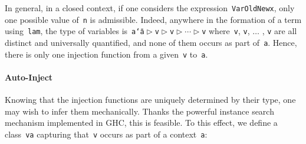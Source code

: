 \documentclass[9pt,authoryear]{sigplanconf}
\begin{document}
%
In general, in a closed context, if one considers the
    expression{~}\texttt{Var}\texttt{\mbox{\hspace{0.50em}}}\texttt{\makebox[1.22ex][l]{$ {(} $}}\texttt{\makebox[1.22ex][l]{$ {(} $}}\texttt{Old}\texttt{\makebox[1.22ex][r]{$ {)} $}}\texttt{}\texttt{\mbox{\hspace{0.50em}}}\texttt{\makebox[1.22ex][l]{$ {(} $}}\texttt{New}\texttt{\mbox{\hspace{0.50em}}}\texttt{x}\texttt{\makebox[1.22ex][r]{$ {)} $}}\texttt{\makebox[1.22ex][r]{$ {)} $}}, only one possible value
    of{~}\texttt{n} is admissible. Indeed, anywhere in the formation of a term
    using{~}\texttt{lam}, the type of variables is{~}\texttt{a}\texttt{\mbox{\hspace{0.50em}}}\texttt{{\char `\=}}\texttt{\mbox{\hspace{0.50em}}}\texttt{a}\texttt{\mbox{\hspace{0.50em}}}\texttt{$ \vartriangleright $}\texttt{\mbox{\hspace{0.50em}}}\texttt{v}\texttt{\mbox{\hspace{0.50em}}}\texttt{$ \vartriangleright $}\texttt{\mbox{\hspace{0.50em}}}\texttt{v}\texttt{\mbox{\hspace{0.50em}}}\texttt{$ \vartriangleright $}\texttt{\mbox{\hspace{0.50em}}}\texttt{$ \cdots $}\texttt{\mbox{\hspace{0.50em}}}\texttt{$ \vartriangleright $}\texttt{\mbox{\hspace{0.50em}}}\texttt{v}    where{~}\texttt{v}, \texttt{v}, $ \ldots $ , \texttt{v} are all distinct and universally
    quantified, and none of them occurs as part of{~}\texttt{a}. Hence, there
    is only one injection function from a given{~}\texttt{v} to{~}\texttt{a}.%


\paragraph*{Auto-Inject}

%
Knowing that the injection functions are uniquely determined by
    their type, one may wish to infer them mechanically. Thanks the
    powerful instance search mechanism implemented in GHC, this is
    feasible. To this effect, we define a class{~}\texttt{v}\texttt{\mbox{\hspace{0.50em}}}\texttt{\makebox[1.22ex][c]{$ \in $}}\texttt{\mbox{\hspace{0.50em}}}\texttt{a} capturing
    that{~}\texttt{v} occurs as part of a context{~}\texttt{a}{:}%
\end{document}
